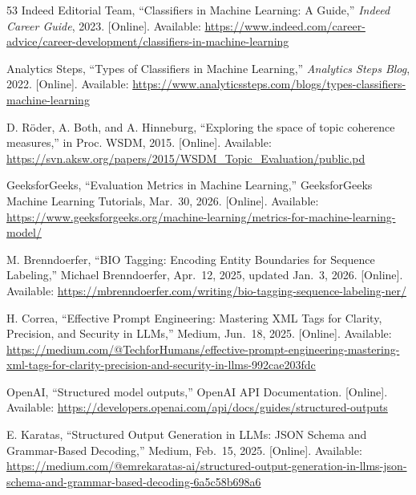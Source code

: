 \documentclass[12pt,oneside,openright,a4paper]{cpe-english-project}
\begin{document}
\begin{thebibliography}{53}
\hypertarget{bib:ref17}{} Indeed Editorial Team, ``Classifiers in Machine Learning: A
Guide,'' \emph{Indeed Career Guide}, 2023. {[}Online{]}. Available:
\url{https://www.indeed.com/career-advice/career-development/classifiers-in-machine-learning}

\hypertarget{bib:ref18}{} Analytics Steps, ``Types of Classifiers in Machine Learning,''
\emph{Analytics Steps Blog}, 2022. {[}Online{]}. Available:
\url{https://www.analyticssteps.com/blogs/types-classifiers-machine-learning}

\hypertarget{bib:ref19}{} D. Röder, A. Both, and A. Hinneburg, ``Exploring the space of
topic coherence measures,'' in Proc. WSDM, 2015. {[}Online{]}.
Available:
\url{https://svn.aksw.org/papers/2015/WSDM_Topic_Evaluation/public.pd}

\hypertarget{bib:ref20}{} GeeksforGeeks, ``Evaluation Metrics in Machine Learning,''
GeeksforGeeks Machine Learning Tutorials, Mar.~30, 2026. {[}Online{]}.
Available:
\url{https://www.geeksforgeeks.org/machine-learning/metrics-for-machine-learning-model/}

\hypertarget{bib:ref21}{} M. Brenndoerfer, ``BIO Tagging: Encoding Entity Boundaries for
Sequence Labeling,'' Michael Brenndoerfer, Apr.~12, 2025, updated
Jan.~3, 2026. {[}Online{]}. Available:
\href{https://mbrenndoerfer.com/writing/bio-tagging-sequence-labeling-ner/?utm_source=chatgpt.com}{https://mbrenndoerfer.com/writing/bio-tagging-sequence-labeling-ner/}

\hypertarget{bib:ref22}{} H. Correa, ``Effective Prompt Engineering: Mastering XML Tags
for Clarity, Precision, and Security in LLMs,'' Medium, Jun.~18, 2025.
{[}Online{]}. Available:
\href{https://medium.com/@TechforHumans/effective-prompt-engineering-mastering-xml-tags-for-clarity-precision-and-security-in-llms-992cae203fdc}{https://medium.com/@TechforHumans/effective-prompt-engineering-mastering-xml-tags-for-clarity-precision-and-security-in-llms-992cae203fdc}

\hypertarget{bib:ref23}{} OpenAI, ``Structured model outputs,'' OpenAI API Documentation.
{[}Online{]}. Available:
\href{https://developers.openai.com/api/docs/guides/structured-outputs?utm_source=chatgpt.com}{https://developers.openai.com/api/docs/guides/structured-outputs}

\hypertarget{bib:ref24}{} E. Karatas, ``Structured Output Generation in LLMs: JSON Schema
and Grammar-Based Decoding,'' Medium, Feb.~15, 2025. {[}Online{]}.
Available:
\href{https://medium.com/@emrekaratas-ai/structured-output-generation-in-llms-json-schema-and-grammar-based-decoding-6a5c58b698a6}{https://medium.com/@emrekaratas-ai/structured-output-generation-in-llms-json-schema-and-grammar-based-decoding-6a5c58b698a6}


\end{thebibliography}
\end{document}
